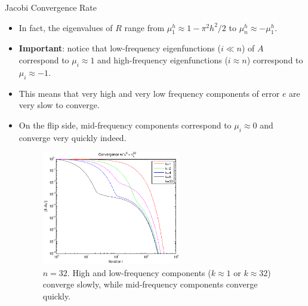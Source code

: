 \documentclass{beamer}
\begin{document}
\begin{frame}[allowframebreaks]{Jacobi Convergence Rate}
\begin{itemize}
\begin{figure}
{            method on our model problem.}
  \end{figure}
  \item In fact, the eigenvalues of $R$ range from $\mu_1^h \approx 1-\pi^2h^2/2$
        to $\mu_n^h \approx -\mu_1^h$.
  \item \textbf{Important}: notice that low-frequency eigenfunctions ($i\ll n$)
        of $A$ correspond to $\mu_i \approx 1$ and high-frequency eigenfunctions
        ($i \approx n$) correspond to $\mu_i \approx -1$.
  \item This means that very high and very low frequency components of error $e$
        are very slow to converge.
  \item On the flip side, mid-frequency components correspond to
        $\mu_i \approx 0$ and converge very quickly indeed.
  \begin{figure}
   \includegraphics[width=6cm]{images/jacobiConvergence_freq.pdf}
   \caption{$n=32$. High and low-frequency components ($k \approx 1$ or
            $k \approx 32$) converge slowly, while mid-frequency components
            converge quickly.}
  \end{figure}
 \end{itemize}
\end{frame}
\end{document}

